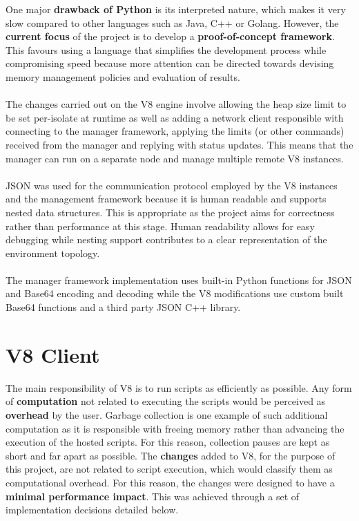 \documentclass{l4proj}
\begin{document}
One major \textbf{drawback of Python} is its interpreted nature, which makes it very slow compared to other languages such as Java, C++ or Golang. However, the \textbf{current focus} of the project is to develop a \textbf{proof-of-concept framework}. This favours using a language that simplifies the development process while compromising speed because more attention can be directed towards devising memory management policies and evaluation of results.
\\\\
\hspace*{1em} The changes carried out on the V8 engine involve allowing the heap size limit to be set per-isolate at runtime as well as adding a network client responsible with connecting to the manager framework, applying the limits (or other commands) received from the manager and replying with status updates. This means that the manager can run on a separate node and manage multiple remote V8 instances.
\\\\
\hspace*{1em} JSON was used for the communication protocol employed by the V8 instances and the management framework because it is human readable and supports nested data structures. This is appropriate as the project aims for correctness rather than performance at this stage. Human readability allows for easy debugging while nesting support contributes to a clear representation of the environment topology.
\\\\
\hspace*{1em} The manager framework implementation uses built-in Python functions for JSON and Base64 encoding and decoding while the V8 modifications use custom built Base64 functions and a third party JSON C++ library.
\section{V8 Client}
\hspace*{1em} The main responsibility of V8 is to run scripts as efficiently as possible. Any form of \textbf{computation} not related to executing the scripts would be perceived as \textbf{overhead} by the user. Garbage collection is one example of such additional computation as it is responsible with freeing memory rather than advancing the execution of the hosted scripts. For this reason, collection pauses are kept as short and far apart as possible. The \textbf{changes} added to V8, for the purpose of this project, are not related to script execution, which would classify them as computational overhead. For this reason, the changes were designed to have a \textbf{minimal performance impact}. This was achieved through a set of implementation decisions detailed below.
\end{document}
